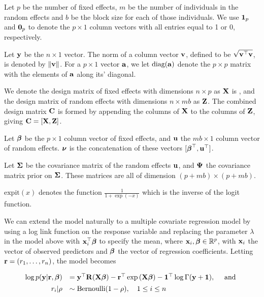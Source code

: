 Let $p$ be the number of fixed effects, $m$ be the number of individuals in the
random effects and $b$ be the block size for each of those individuals. We use
${\bf 1}_p$ and ${\bf 0}_p$ to denote the $p \times 1$ column vectors with all
entries equal to 1 or 0, respectively.

Let ${\bf y}$ be the $n \times 1$ vector. The norm of a column vector ${\bf v}$,
defined to be $\sqrt{{\bf v}^\top {\bf v}}$, is  denoted by $\|{\bf v}\|$. For a $p \times
1$ vector ${\bf a}$, we let $\text{diag}{({\bf a})}$ denote the $p \times p$ matrix with the
elements of ${\bf a}$ along its' diagonal.

We denote the design matrix of fixed effects with dimensions $n \times p$ as
${\bf X}$ is , and the design matrix of random  effects with dimensions $n \times m
b$ as ${\bf Z}$. The combined design matrix ${\bf C}$ is formed by appending the
columns of ${\bf X}$ to the columns of ${\bf Z}$, giving ${\bf C} = [ {\bf X}, {\bf Z} ]$.

Let ${\boldsymbol \beta}$ be the $p \times 1$ column vector of fixed effects, and ${\bf u}$ the
$m b \times 1$ column vector of random effects. ${\boldsymbol \nu}$ is the concatenation of
these vectors $[{\boldsymbol \beta}^\top, {\bf u}^\top]$.

Let ${\boldsymbol \Sigma}$ be the covariance matrix of the random effects ${\bf u}$, and ${\boldsymbol \Psi}$
the covariance matrix prior on ${\boldsymbol \Sigma}$.  These matrices are all of dimension
$(p + m b) \times (p + m b)$.

$\text{expit}(x)$ denotes the function $\tfrac{1}{1 + \exp(-x)}$ which is the
inverse of the logit function.

We can extend the model naturally to a multiple covariate regression model by
using a log link function on the response variable and replacing the parameter
$\lambda$ in the model above with ${\bf x}_i^\top {\boldsymbol\beta}$ to specify the mean,
where ${\bf x}_i,{\boldsymbol \beta} \in {\mathbb{R}}^p$, with ${\bf x}_i$ the vector of observed predictors
and ${\boldsymbol \beta}$ the vector of regression coefficients. Letting ${\bf r} =
(r_1,\ldots,r_n)$, the model becomes

\begin{equation*}%
	\begin{array}{rl}
		\log p(\vy|\vr, \vbeta) 
		    & = \vy^\top \mR (\mX\vbeta)                           
		- \vr^\top \exp{(\mX\vbeta)} 
		- \vone^\top \log{\Gamma{(\vy + \vone)}}, \quad \mbox{ and }\\ [1ex]
		r_i | \rho & \sim \text{Bernoulli}(1-\rho), \quad 1 \leq i \leq n \\
	\end{array}
\end{equation*}

